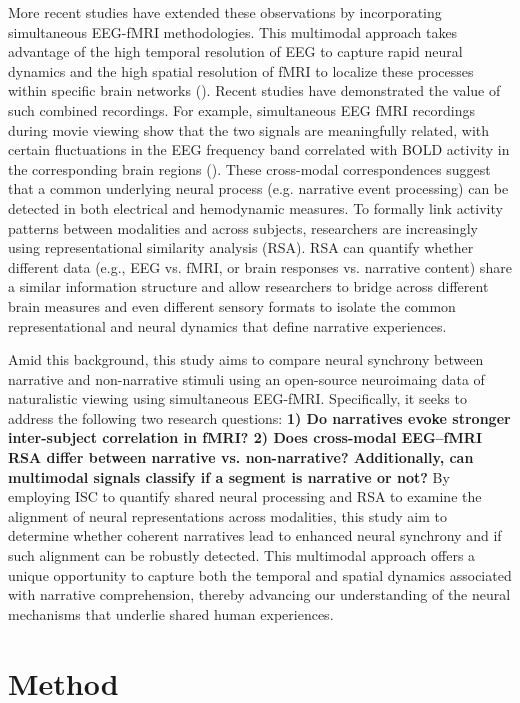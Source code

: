 \documentclass[stu,12pt,floatsintext]{apa7}
\begin{document}
More recent studies have extended these observations by incorporating simultaneous EEG-fMRI methodologies. This multimodal approach takes advantage of the high temporal resolution of EEG to capture rapid neural dynamics and the high spatial resolution of fMRI to localize these processes within specific brain networks (\cite{haufe_elucidating_2018}). Recent studies have demonstrated the value of such combined recordings. For example, simultaneous EEG fMRI recordings during movie viewing show that the two signals are meaningfully related, with certain fluctuations in the EEG frequency band correlated with BOLD activity in the corresponding brain regions (\cite{haufe_elucidating_2018}). These cross-modal correspondences suggest that a common underlying neural process (e.g. narrative event processing) can be detected in both electrical and hemodynamic measures. To formally link activity patterns between modalities and across subjects, researchers are increasingly using representational similarity analysis (RSA). RSA can quantify whether different data (e.g., EEG vs. fMRI, or brain responses vs. narrative content) share a similar information structure and allow researchers to bridge across different brain measures and even different sensory formats to isolate the common representational and neural dynamics that define narrative experiences.

Amid this background, this study aims to compare neural synchrony between narrative and non-narrative stimuli using an open-source neuroimaing data of naturalistic viewing using simultaneous EEG-fMRI. Specifically, it seeks to address the following two research questions: \textbf{1) Do narratives evoke stronger inter-subject correlation in fMRI? 2) Does cross-modal EEG–fMRI RSA differ between narrative vs. non-narrative? Additionally, can multimodal signals classify if a segment is narrative or not?} By employing ISC to quantify shared neural processing and RSA to examine the alignment of neural representations across modalities, this study aim to determine whether coherent narratives lead to enhanced neural synchrony and if such alignment can be robustly detected. This multimodal approach offers a unique opportunity to capture both the temporal and spatial dynamics associated with narrative comprehension, thereby advancing our understanding of the neural mechanisms that underlie shared human experiences.

\section{Method}
\end{document}
